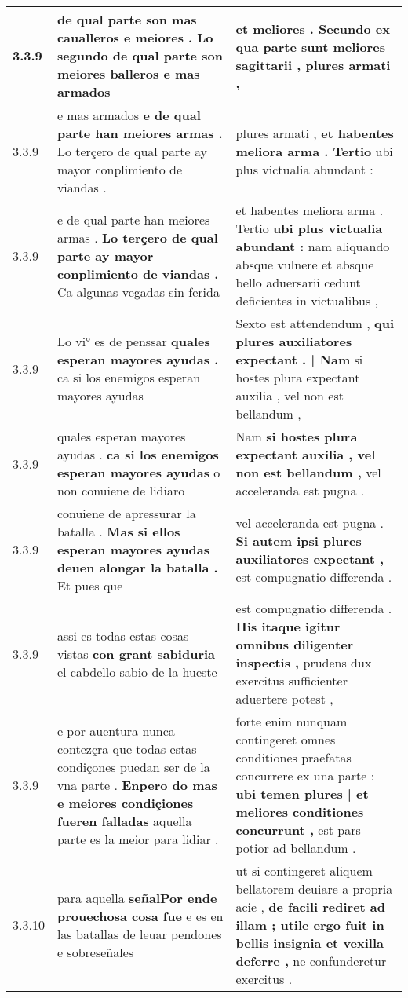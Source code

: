 \begin{tabular}{|p{1cm}|p{6.5cm}|p{6.5cm}|}
3.3.9 & de qual parte son mas caualleros e meiores . \textbf{ Lo segundo de qual parte son meiores balleros } e mas armados & et meliores . \textbf{ Secundo ex qua parte sunt meliores sagittarii , } plures armati , \\\hline
3.3.9 & e mas armados \textbf{ e de qual parte han meiores armas . } Lo terçero de qual parte ay mayor conplimiento de viandas . & plures armati , \textbf{ et habentes meliora arma . Tertio } ubi plus victualia abundant : \\\hline
3.3.9 & e de qual parte han meiores armas . \textbf{ Lo terçero de qual parte ay mayor conplimiento de viandas . } Ca algunas vegadas sin ferida & et habentes meliora arma . Tertio \textbf{ ubi plus victualia abundant : } nam aliquando absque vulnere et absque bello aduersarii cedunt deficientes in victualibus , \\\hline
3.3.9 & Lo vi° es de penssar \textbf{ quales esperan mayores ayudas . } ca si los enemigos esperan mayores ayudas & Sexto est attendendum , \textbf{ qui plures auxiliatores expectant . | Nam } si hostes plura expectant auxilia , vel non est bellandum , \\\hline
3.3.9 & quales esperan mayores ayudas . \textbf{ ca si los enemigos esperan mayores ayudas } o non conuiene de lidiaro & Nam \textbf{ si hostes plura expectant auxilia , vel non est bellandum , } vel acceleranda est pugna . \\\hline
3.3.9 & conuiene de apressurar la batalla . \textbf{ Mas si ellos esperan mayores ayudas deuen alongar la batalla . } Et pues que & vel acceleranda est pugna . \textbf{ Si autem ipsi plures auxiliatores expectant , } est compugnatio differenda . \\\hline
3.3.9 & assi es todas estas cosas vistas \textbf{ con grant sabiduria } el cabdello sabio de la hueste & est compugnatio differenda . \textbf{ His itaque igitur omnibus diligenter inspectis , } prudens dux exercitus sufficienter aduertere potest , \\\hline
3.3.9 & e por auentura nunca contezçra que todas estas condiçones puedan ser de la vna parte . \textbf{ Enpero do mas e meiores condiçiones fueren falladas } aquella parte es la meior para lidiar . & forte enim nunquam contingeret omnes conditiones praefatas concurrere ex una parte : \textbf{ ubi temen plures | et meliores conditiones concurrunt , } est pars potior ad bellandum . \\\hline
3.3.10 & para aquella \textbf{ señalPor ende prouechosa cosa fue } e es en las batallas de leuar pendones e sobreseñales & ut si contingeret aliquem bellatorem deuiare a propria acie , \textbf{ de facili rediret ad illam ; utile ergo fuit in bellis insignia et vexilla deferre , } ne confunderetur exercitus . \\\hline

\end{tabular}

